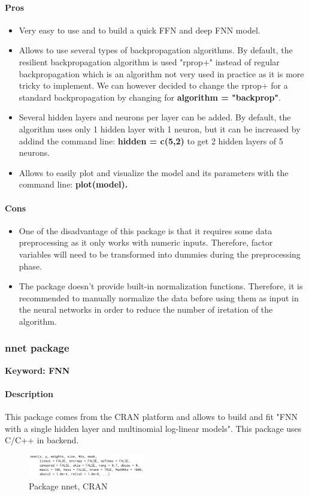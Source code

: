 \documentclass[6pt,letter]{article}\usepackage[]{graphicx}\usepackage[]{color}
\begin{document}
\paragraph{Pros}
\begin{itemize}
\item Very easy to use and to build a quick FFN and deep FNN model.
\item Allows to use several types of backpropagation algorithms. By default, the resilient backpropagation algorithm is used "rprop+" instead of regular backpropagation which is an algorithm not very used in practice as it is more tricky to implement. We can however decided to change the rprop+ for a standard backpropagation by changing for \textbf{algorithm = "backprop"}.
\item Several hidden layers and neurons per layer can be added. By default, the algorithm uses only 1 hidden layer with 1 neuron, but it can be increased by addind the command line: \textbf{hidden = c(5,2)} to get 2 hidden layers of 5 neurons.
\item Allows to easily plot and visualize the model and its parameters with the command line: \textbf{plot(model).}
\end{itemize}
\paragraph{Cons}
\begin{itemize}
\item One of the disadvantage of this package is that it requires some data preprocessing as it only works with numeric inputs. Therefore, factor variables will need to be transformed into dummies during the preprocessing phase. 
\item The package doesn't provide built-in normalization functions. Therefore, it is recommended to manually normalize the data before using them as input in the neural networks in order to reduce the number of iretation of the algorithm.
\end{itemize}

\subsubsection{nnet package}
\textbf{Keyword: FNN}
\paragraph{Description}
This package comes from the CRAN platform and allows to build and fit "FNN with a single hidden layer and multinomial log-linear models". This package uses C/C++ in backend.
\begin{figure}[h]
    \centering
    \includegraphics[width=0.45\textwidth]{figure/nnet_package.png}
     \caption{Package nnet, CRAN}
\end{figure}
\end{document}
